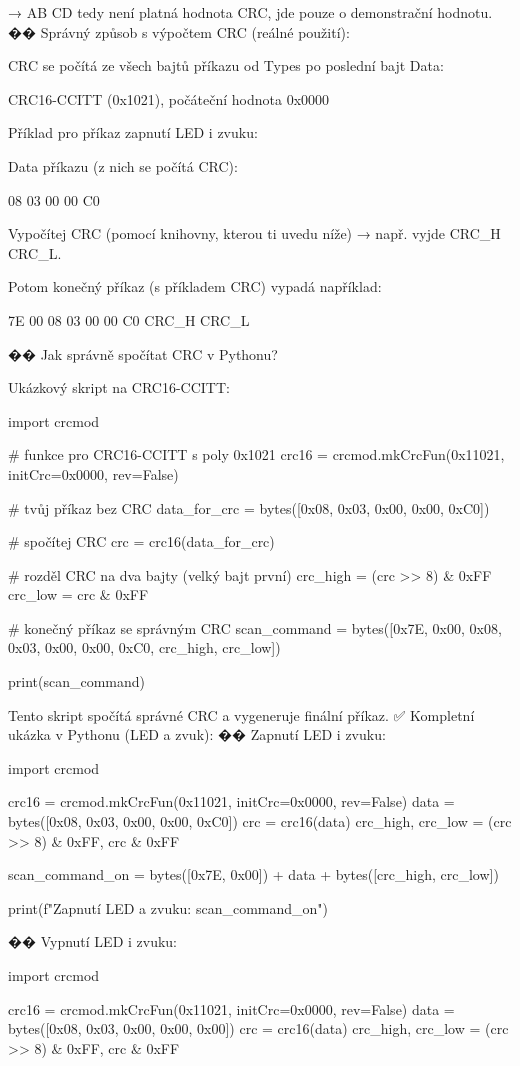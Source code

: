 → AB CD tedy není platná hodnota CRC, jde pouze o demonstrační hodnotu.
�� Správný způsob s výpočtem CRC (reálné použití):

CRC se počítá ze všech bajtů příkazu od Types po poslední bajt Data:

CRC16-CCITT (0x1021), počáteční hodnota 0x0000

Příklad pro příkaz zapnutí LED i zvuku:

Data příkazu (z nich se počítá CRC):

08 03 00 00 C0

Vypočítej CRC (pomocí knihovny, kterou ti uvedu níže) → např. vyjde CRC_H CRC_L.

Potom konečný příkaz (s příkladem CRC) vypadá například:

7E 00 08 03 00 00 C0 CRC_H CRC_L

�� Jak správně spočítat CRC v Pythonu?

Ukázkový skript na CRC16-CCITT:

import crcmod

# funkce pro CRC16-CCITT s poly 0x1021
crc16 = crcmod.mkCrcFun(0x11021, initCrc=0x0000, rev=False)

# tvůj příkaz bez CRC
data_for_crc = bytes([0x08, 0x03, 0x00, 0x00, 0xC0])

# spočítej CRC
crc = crc16(data_for_crc)

# rozděl CRC na dva bajty (velký bajt první)
crc_high = (crc >> 8) & 0xFF
crc_low = crc & 0xFF

# konečný příkaz se správným CRC
scan_command = bytes([0x7E, 0x00, 0x08, 0x03, 0x00, 0x00, 0xC0, crc_high, crc_low])

print(scan_command)

Tento skript spočítá správné CRC a vygeneruje finální příkaz.
✅ Kompletní ukázka v Pythonu (LED a zvuk):
�� Zapnutí LED i zvuku:

import crcmod

crc16 = crcmod.mkCrcFun(0x11021, initCrc=0x0000, rev=False)
data = bytes([0x08, 0x03, 0x00, 0x00, 0xC0])
crc = crc16(data)
crc_high, crc_low = (crc >> 8) & 0xFF, crc & 0xFF

scan_command_on = bytes([0x7E, 0x00]) + data + bytes([crc_high, crc_low])

print(f"Zapnutí LED a zvuku: {scan_command_on}")

�� Vypnutí LED i zvuku:

import crcmod

crc16 = crcmod.mkCrcFun(0x11021, initCrc=0x0000, rev=False)
data = bytes([0x08, 0x03, 0x00, 0x00, 0x00])
crc = crc16(data)
crc_high, crc_low = (crc >> 8) & 0xFF, crc & 0xFF

